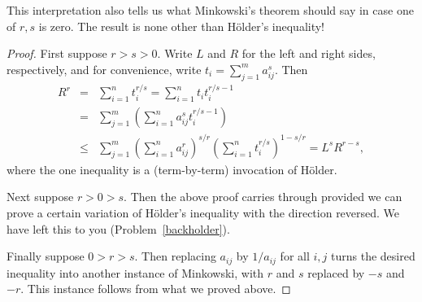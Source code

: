 \documentclass[12pt]{report}
\numberwithin{exc}{section}
\begin{document}
This interpretation also tells us what Minkowski's theorem should say in
case one of $r,s$ is zero. The result is none other than H\"older's
inequality!
\begin{proof}
First suppose $r>s>0$.
Write $L$ and $R$ for the left and right sides, respectively,
and for convenience, write $t_i = \sum_{j=1}^m a_{ij}^s$. Then
\begin{eqnarray*}
R^r &=&  \sum_{i=1}^n t_i^{r/s} =  \sum_{i=1}^n t_i t_i^{r/s - 1} \\
&=& \sum_{j=1}^m \left( \sum_{i=1}^n a_{ij}^s t_i^{r/s - 1} \right) \\
&\leq& \sum_{j=1}^m \left( \sum_{i=1}^n a_{ij}^r \right)^{s/r}
\left( \sum_{i=1}^n t_i^{r/s} \right)^{1-s/r} = L^s R^{r-s},
\end{eqnarray*}
where the one inequality is a (term-by-term) invocation of H\"older.

Next suppose $r>0>s$. Then the above proof carries through provided
we can prove a certain variation of H\"older's inequality with the
direction reversed. We have left this to you (Problem~\ref{backholder}).

Finally suppose $0>r>s$. Then replacing $a_{ij}$ by $1/a_{ij}$ for all $i,j$
turns the desired inequality into another instance of Minkowski, with $r$ and $s$ replaced by $-s$ and $-r$. This instance follows from what we proved above.
\end{proof}
\end{document}
